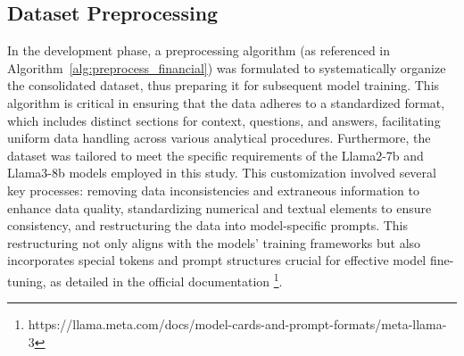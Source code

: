 \documentclass[logo,msc]{infthesis}           %
\begin{document}
\subsection{Dataset Preprocessing}
\begin{comment}
\begin{itemize}
    \item Algorithm Development: A preprocessing algorithm~\ref{alg:preprocess_financial} was created to prepare the merged dataset for model training. This algorithm ensures that the data follows a unified structure comprising context, questions, and answers.
    \item Prompt Template: The data was formatted into a specific template prompt format required by both Llama2 7b and Llama3 8b models that are used in this project. This involved:
    \begin{itemize}
        \item Data Cleaning: Removing inconsistencies and irrelevant information.
        \item Normalization: Standardizing numerical values and textual content to maintain uniformity.
        \item Prompt Structuring: Organizing the data into the structured prompts that the models were originally trained on, ensuring compatibility and effectiveness during fine-tuning. This include use of special tokens and prompt structure of the specific model \footnote{https://llama.meta.com/docs/model-cards-and-prompt-formats/meta-llama-3}. 
    \end{itemize}
\end{itemize}
\end{comment}
In the development phase, a preprocessing algorithm (as referenced in Algorithm~\ref{alg:preprocess_financial}) was formulated to systematically organize the consolidated dataset, thus preparing it for subsequent model training. This algorithm is critical in ensuring that the data adheres to a standardized format, which includes distinct sections for context, questions, and answers, facilitating uniform data handling across various analytical procedures. Furthermore, the dataset was tailored to meet the specific requirements of the Llama2-7b and Llama3-8b models employed in this study. This customization involved several key processes: removing data inconsistencies and extraneous information to enhance data quality, standardizing numerical and textual elements to ensure consistency, and restructuring the data into model-specific prompts. This restructuring not only aligns with the models' training frameworks but also incorporates special tokens and prompt structures crucial for effective model fine-tuning, as detailed in the official documentation \footnote{https://llama.meta.com/docs/model-cards-and-prompt-formats/meta-llama-3}.
\end{document}
